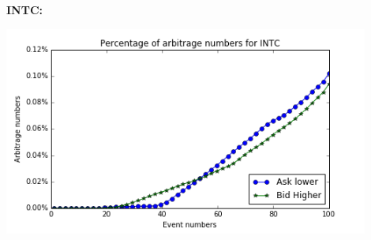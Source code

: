 \documentclass[xcolor={x11names,svgnames,dvipsnames}]{beamer}
\begin{document}
\begin{frame}
\begin{columns}
\begin{column}{.5\textwidth}
			 \textbf{INTC:}
	
										\includegraphics[width=0.9\textwidth, height=0.35\textheight]{INTC_arbitrage_event.png}

		\end{column}
	\end{columns}

\end{frame}
\end{document}
